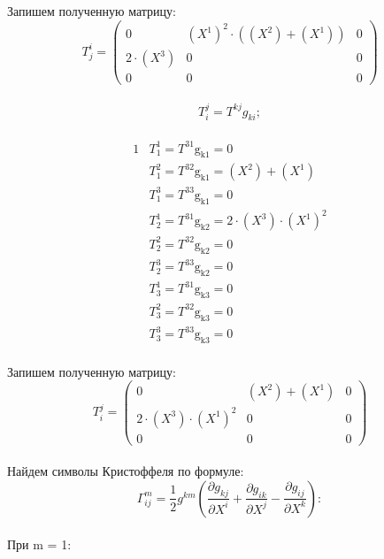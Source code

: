 \documentclass[a4paper, 12pt, oneside]{article}
\begin{document}
Запишем полученную матрицу:\\
\[
T^i_j=\begin{pmatrix}
	0 & (X^1)^2\cdot ((X^2) + (X^1)) & 0\\
	2\cdot (X^3) & 0 & 0\\
	0 & 0 & 0
\end{pmatrix}
\]\\
\[
T^j_i = T^{kj}g_{ki};
\]\\
\begin{alignat*}{1}
  & T^1_1 = T^{31}\mathrm{g_{k1} = }0 \\
  & T^2_1 = T^{32}\mathrm{g_{k1} = }(X^2) + (X^1) \\
  & T^3_1 = T^{33}\mathrm{g_{k1} = }0 \\
  & T^1_2 = T^{31}\mathrm{g_{k2} = }2\cdot (X^3)\cdot (X^1)^2 \\
  & T^2_2 = T^{32}\mathrm{g_{k2} = }0 \\
  & T^3_2 = T^{33}\mathrm{g_{k2} = }0 \\
  & T^1_3 = T^{31}\mathrm{g_{k3} = }0 \\
  & T^2_3 = T^{32}\mathrm{g_{k3} = }0 \\
  & T^3_3 = T^{33}\mathrm{g_{k3} = }0 
\end{alignat*}\\
Запишем полученную матрицу:\\
\[
T^j_i=\begin{pmatrix}
	0 & (X^2) + (X^1) & 0\\
	2\cdot (X^3)\cdot (X^1)^2 & 0 & 0\\
	0 & 0 & 0
\end{pmatrix}
\]\\
Найдем символы Кристоффеля по формуле:\\
\[
\Gamma^m_{ij} = \frac{1}{2}g^{km}(\frac{\partial g_{kj}}{\partial X^i} + \frac{\partial g_{ik}}{\partial X^j} - \frac{\partial g_{ij}}{\partial X^k}):
\]\\
При m = 1:\\
\end{document}
